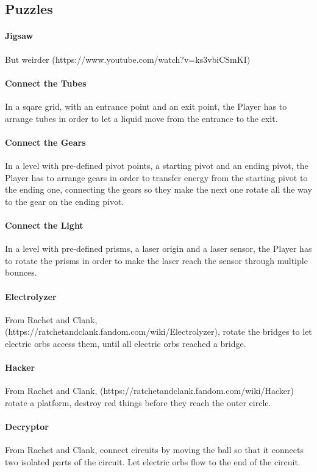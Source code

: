 \subsection{Puzzles}

\paragraph{Jigsaw} But weirder (https://www.youtube.com/watch?v=ks3vbiCSmKI)

\paragraph{Connect the Tubes} In a sqare grid, with an entrance point and an exit point, the Player has to arrange tubes in order to let a liquid move from the entrance to the exit.

\paragraph{Connect the Gears} In a level with pre-defined pivot points, a starting pivot and an ending pivot, the Player has to arrange gears in order to transfer energy from the starting pivot to the ending one, connecting the gears so they make the next one rotate all the way to the gear on the ending pivot.

\paragraph{Connect the Light} In a level with pre-defined prisms, a laser origin and a laser sensor, the Player has to rotate the prisms in order to make the laser reach the sensor through multiple bounces.

\paragraph{Electrolyzer} From Rachet and Clank, (https://ratchetandclank.fandom.com/wiki/Electrolyzer), rotate the bridges to let electric orbs access them, until all electric orbs reached a bridge.

\paragraph{Hacker} From Rachet and Clank, (https://ratchetandclank.fandom.com/wiki/Hacker) rotate a platform, destroy red things before they reach the outer circle.

\paragraph{Decryptor} From Rachet and Clank, connect circuits by moving the ball so that it connects two isolated parts of the circuit. Let electric orbs flow to the end of the circuit.

